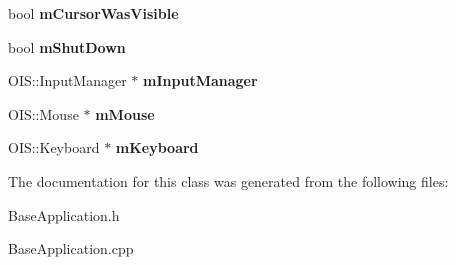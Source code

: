 \begin{DoxyCompactItemize}
\item 
\hypertarget{classBaseApplication_ac7e861799862cb645f1d78b170aef80d}{bool {\bfseries m\-Cursor\-Was\-Visible}}\label{classBaseApplication_ac7e861799862cb645f1d78b170aef80d}

\item 
\hypertarget{classBaseApplication_a755f26d3a9915aaf830750d877e39d86}{bool {\bfseries m\-Shut\-Down}}\label{classBaseApplication_a755f26d3a9915aaf830750d877e39d86}

\item 
\hypertarget{classBaseApplication_abc9503c8462e225b5d0d55c952d9e4a9}{O\-I\-S\-::\-Input\-Manager $\ast$ {\bfseries m\-Input\-Manager}}\label{classBaseApplication_abc9503c8462e225b5d0d55c952d9e4a9}

\item 
\hypertarget{classBaseApplication_add9b97fbe64da2814d3af113bac58c43}{O\-I\-S\-::\-Mouse $\ast$ {\bfseries m\-Mouse}}\label{classBaseApplication_add9b97fbe64da2814d3af113bac58c43}

\item 
\hypertarget{classBaseApplication_a9d6e19cf50c47379fbaae55bff28079c}{O\-I\-S\-::\-Keyboard $\ast$ {\bfseries m\-Keyboard}}\label{classBaseApplication_a9d6e19cf50c47379fbaae55bff28079c}

\end{DoxyCompactItemize}


The documentation for this class was generated from the following files\-:\begin{DoxyCompactItemize}
\item 
Base\-Application.\-h\item 
Base\-Application.\-cpp\end{DoxyCompactItemize}
